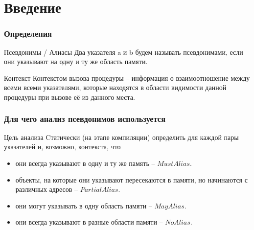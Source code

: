 \documentclass[utf8,russian]{beamer}
\begin{document}
\section{Введение}

\begin{frame}
\frametitle{Определения}

\begin{block}{Псевдонимы / Алиасы}
Два указателя a и b будем называть псевдонимами, если они указывают на одну и ту же область памяти.
\end{block}

\begin{block}{Контекст}
Контекстом вызова процедуры -- информация о взаимоотношение между всеми всеми указателями, которые находятся в области видимости данной процедуры при вызове её из данного места.
\end{block}

\end{frame}


\begin{frame}
\frametitle{Для чего анализ псевдонимов используется}

\begin{block}{Цель анализа}
Cтатически (на этапе компиляции) определить для каждой пары указателей и, возможно, контекста, что
\begin{itemize}
\item они всегда указывают в одну и ту же память -- $MustAlias$.
\item объекты, на которые они указывают пересекаются в памяти, но начинаются с различных адресов -- $PartialAlias$.
\item они могут указывать в одну область памяти -- $MayAlias$.
\item они всегда указывают в разные области памяти -- $NoAlias$.
\end{itemize}
\end{block}

\end{frame}

\end{document}
